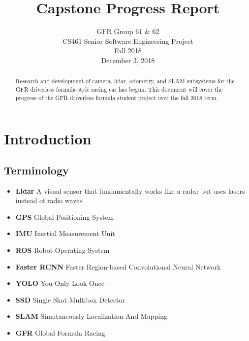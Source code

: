 \documentclass[10pt, onecolumn, draftclsnofoot, letterpaper,compsoc]{IEEEtran}
\title{Capstone Progress Report}
\author{GFR Group 61 \& 62 \\
        CS461 Senior Software Engineering Project \\
        Fall 2018 \\
        December 3, 2018}
\begin{document}
\maketitle
\begin{abstract}
Research and development of camera, lidar, odometry, and SLAM subsystems for the GFR driverless formula style racing car has begun. This document will cover the progress of the GFR driverless formula student project over the fall 2018 term. 
\end{abstract}

\newpage
\tableofcontents
\newpage

\section{Introduction}

\subsection{Terminology}

\begin{itemize}
    \item \textbf{Lidar} A visual sensor that fundamentally works like a radar but uses lasers instead of radio waves
    \item \textbf{GPS} Global Positioning System
    \item \textbf{IMU} Inertial Measurement Unit
    \item \textbf{ROS} Robot Operating System
    \item \textbf{Faster RCNN} Faster Region-based Convolutional Neural Network
    \item \textbf{YOLO} You Only Look Once
    \item \textbf{SSD} Single Shot Multibox Detector
    \item \textbf{SLAM} Simutaneously Localization And Mapping 
    \item \textbf{GFR} Global Formula Racing
\end{itemize}

\end{document}
